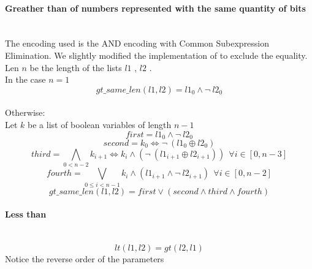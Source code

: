   \paragraph*{Greather than of numbers represented with the same quantity of bits}  \hfill \\
    The encoding used is the AND encoding with Common Subexpression Elimination. We slightly
    modified the implementation of \cite{Zhao} to exclude the equality.\\
    Len \(n\)  be the length of the lists \(l1\) , \(l2\) .\\
    In the case \(n = 1\) 
    \begin{equation}
      gt\_same\_len(l1, l2) = l1_0 \land \neg \ l2_0
    \end{equation}\\

    Otherwise:\\
    Let \(k\)  be a list of boolean variables of length \(n-1\) 
    \begin{equation}
      first =  l1_0 \land \neg \ l2_0 %
    \end{equation}
    \begin{equation}
      second = k_0 \Longleftrightarrow \neg \ (l1_0 \oplus l2_0) %
    \end{equation}
    \begin{equation}
      third = \bigwedge_{0 < n-2} k_{i+1} \Longleftrightarrow k_i \land (\neg \ (l1_{i+1} \oplus l2_{i+1})) \ \ \forall i \in [0, n-3]
    \end{equation}
    \begin{equation}
      fourth = \bigvee_{0 \leq i < n-1} k_i \land (l1_{i+1} \land \neg \ l2_{i+1})  \ \ \forall i \in [0, n-2]
    \end{equation}
    \begin{equation}
      gt\_same\_len(l1, l2) = first \lor (second \land third \land fourth)
    \end{equation}

  \paragraph*{Less than} \hfill \\
    \begin{equation}
      lt(l1, l2) = gt(l2, l1) %
    \end{equation}
    Notice the reverse order of the parameters\\

